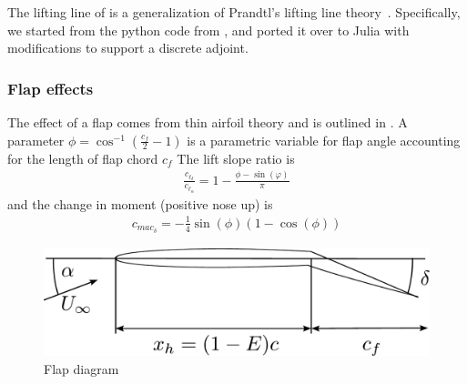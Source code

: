 \documentclass[10pt]{article}
\newcommand{\be}{\begin{eqnarray}}
\newcommand{\ee}{\end{eqnarray}}
\newcommand{\Uinf}{U_{\infty}}
\begin{document}
The lifting line of \citet{Phillips2000} is a generalization of Prandtl's lifting line theory~\cite{Prandtl1918a}.
Specifically, we started from the python code from \citet{Reid2021}, and ported it over to Julia with modifications to support a discrete adjoint.

\subsubsection{Flap effects}
The effect of a flap comes from thin airfoil theory and is outlined in \citet{Glauert1924,Glauert1927}.
A parameter $\phi = \cos^{-1}\left(\frac{c_f}{2} -1\right)$ is a parametric variable for flap angle accounting for the length of flap chord $c_f$
The lift slope ratio is
\be
\frac{c_{\ell_\delta}}
{c_{\ell_\alpha}}
=
1 - \frac{\phi - \sin(\varphi)}{\pi}
\ee
and the change in moment (positive nose up) is
\be
c_{mac_{\delta}} = -\frac{1}{4}\sin(\phi) \left( 1 - \cos(\phi)\right)
\ee
\begin{figure}[htbp!]
	\centering
	\includegraphics[width=0.5\linewidth,clip,trim={0cm 0cm 0cm 0cm}]{FlapHydrofoil.pdf}
	\caption{\label{fig:Flap}
		Flap diagram
	}
\end{figure}
\end{document}
